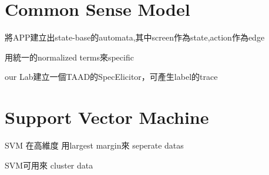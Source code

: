 \clearpage

\section{Common Sense Model}

將APP建立出state-base的automata,其中screen作為state,action作為edge

用統一的normalized terms來specific

our Lab建立一個TAAD的SpecElicitor，可產生label的trace


\section{Support Vector Machine}

SVM 在高維度 用largest margin來 seperate datas 

SVM可用來 cluster data